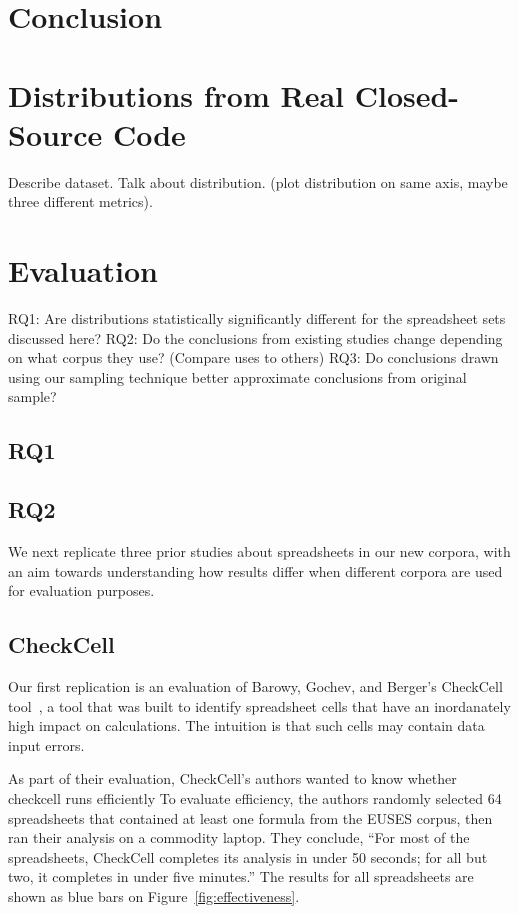 \documentclass{sig-alternate} %
\begin{document}
\section{Conclusion}

\section{Distributions from Real Closed-Source Code}

Describe dataset.
Talk about distribution. (plot distribution on same axis, maybe three different metrics).

\section{Evaluation}

RQ1: Are distributions statistically significantly different for the spreadsheet sets discussed here?
RQ2: Do the conclusions from existing studies change depending on what corpus they use? (Compare uses to others)
RQ3: Do conclusions drawn using our sampling technique better approximate conclusions from original sample?

\subsection{RQ1}

\subsection{RQ2}

We next replicate three prior studies about spreadsheets in our new corpora,
with an aim towards understanding how results differ when different corpora are
used for evaluation purposes.

\subsection{CheckCell}

Our first replication is an evaluation of Barowy, Gochev, and Berger's
CheckCell tool~\cite{Barowy14}, a tool that was built to identify spreadsheet
cells that have an inordanately high impact on calculations.
The intuition is that such cells may contain data input errors.

As part of their evaluation, CheckCell's authors wanted to know whether checkcell runs efficiently
To evaluate efficiency, the authors randomly selected 64 spreadsheets that contained at least one
formula from the EUSES corpus, then ran their analysis on a commodity laptop.
They conclude, ``For most of the spreadsheets, CheckCell completes its analysis in under 50 seconds;
for all but two, it completes in under five minutes.''
The results for all spreadsheets are shown as blue bars on Figure~\ref{fig:effectiveness}.
\end{document}
